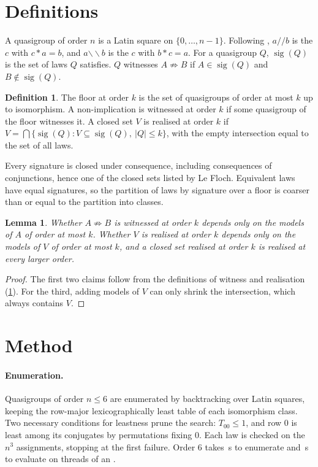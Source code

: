 \documentclass[11pt,a4paper]{article}
\newcommand{\ldiv}{\mathbin{/\!/}}
\newcommand{\rdiv}{\mathbin{\backslash\!\backslash}}
\newtheorem{lemma}{Lemma}
\theoremstyle{definition}
\newtheorem{definition}{Definition}
\begin{document}
\section{Definitions}

A quasigroup of order $n$ is a Latin square on $\{0,\dots,n-1\}$. Following
\cite{lefloch}, $a \ldiv b$ is the $c$ with $c * a = b$, and $a \rdiv b$ is the $c$
with $b * c = a$. For a quasigroup $Q$, $\operatorname{sig}(Q)$ is the set of laws
$Q$ satisfies. $Q$ witnesses $A \not\Rightarrow B$ if $A \in \operatorname{sig}(Q)$
and $B \notin \operatorname{sig}(Q)$.

\begin{definition}\label{def:floor}
The floor at order $k$ is the set of quasigroups of order at most $k$ up to
isomorphism. A non-implication is witnessed at order $k$ if some quasigroup of the
floor witnesses it. A closed set $V$ is realised at order $k$ if
$V = \bigcap \{\operatorname{sig}(Q) : V \subseteq \operatorname{sig}(Q),\ |Q| \le k\}$,
with the empty intersection equal to the set of all laws.
\end{definition}

Every signature is closed under consequence, including consequences of conjunctions,
hence one of the \NVarieties{} closed sets listed by Le Floch. Equivalent laws have equal signatures, so the partition of laws by signature
over a floor is coarser than or equal to the partition into classes.

\begin{lemma}\label{lem:local}
Whether $A \not\Rightarrow B$ is witnessed at order $k$ depends only on the models of
$A$ of order at most $k$. Whether $V$ is realised at order $k$ depends only on the
models of $V$ of order at most $k$, and a closed set realised at order $k$ is realised
at every larger order.
\end{lemma}
\begin{proof}
The first two claims follow from the definitions of witness and realisation
(\cref{def:floor}). For the third, adding models of $V$ can only shrink the
intersection, which always contains $V$.
\end{proof}

\section{Method}

\paragraph{Enumeration.}
Quasigroups of order $n \le 6$ are enumerated by backtracking over Latin squares,
keeping the row-major lexicographically least table of each isomorphism class. Two
necessary conditions for leastness prune the search: $T_{00} \le 1$, and row 0 is
least among its conjugates by permutations fixing 0. Each law is checked on the
$n^3$ assignments, stopping at the first failure. Order 6 takes \EnumSecsSix{}\,s to
enumerate and \SigSecsSix{}\,s to evaluate on \Threads{} threads of an \CPU.
\end{document}
